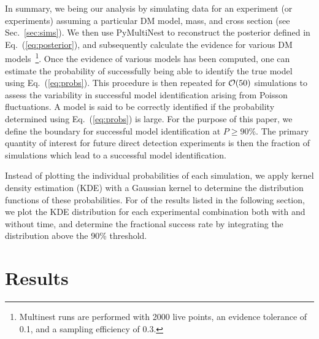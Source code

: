 \documentclass[11pt]{article}
\newcommand{\Eq}[1]{Eq.~(\ref{#1})} \newcommand{\Eqs}[2]{Eqs.~(\ref{#1}) and (\ref{#2})} \newcommand{\Eqm}[2]{Eqs.~(\ref{#1}) through (\ref{#2})}
\begin{document}
In summary, we being our analysis by simulating data for an experiment (or experiments) assuming a particular DM model, mass, and cross section (see Sec.~\ref{sec:sims}). We then use PyMultiNest to reconstruct the posterior defined in \Eq{eq:posterior}, and subsequently calculate the evidence for various DM models~\cite{pymultinest,Feroz:2008xx}\footnote{Multinest runs are performed with 2000 live points, an evidence tolerance of 0.1, and a sampling efficiency of 0.3.}. Once the evidence of various models has been computed, one can estimate the probability of successfully being able to identify the true model using \Eq{eq:probs}. This procedure is then repeated for ${\cal O}(50)$ simulations to assess the variability in successful model identification arising from Poisson fluctuations. A model is said to be correctly identified if the probability determined using \Eq{eq:probs} is large. For the purpose of this paper, we define the boundary for successful model identification at $P \geq 90\%$. The primary quantity of interest for future direct detection experiments is then the fraction of simulations which lead to a successful model identification.    

Instead of plotting the individual probabilities of each simulation, we apply kernel density estimation (KDE) with a Gaussian kernel to determine the distribution functions of these probabilities. For of the results listed in the following section, we plot the KDE distribution for each experimental combination both with and without time, and determine the fractional success rate by integrating the distribution above the 90\% threshold. 


\section{Results}\label{sec:results}
\end{document}
